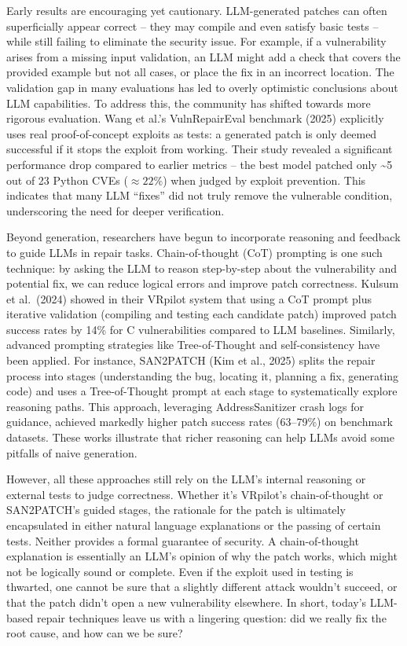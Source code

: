\documentclass[conference,compsoc]{IEEEtran}
\begin{document}
Early results are encouraging yet cautionary. LLM-generated patches can
often superficially appear correct -- they may compile and even satisfy
basic tests -- while still failing to eliminate the security issue. For
example, if a vulnerability arises from a missing input validation, an
LLM might add a check that covers the provided example but not all
cases, or place the fix in an incorrect location. The validation gap in
many evaluations has led to overly optimistic conclusions about LLM
capabilities. To address this, the community has shifted towards more
rigorous evaluation. Wang et al.'s VulnRepairEval benchmark (2025)
explicitly uses real proof-of-concept exploits as tests: a generated
patch is only deemed successful if it stops the exploit from working.
Their study revealed a significant performance drop compared to earlier
metrics -- the best model patched only \textasciitilde5 out of 23 Python
CVEs ($\approx 22\%$) when judged by exploit prevention. This indicates that many
LLM ``fixes'' did not truly remove the vulnerable condition,
underscoring the need for deeper verification.

Beyond generation, researchers have begun to incorporate reasoning and
feedback to guide LLMs in repair tasks. Chain-of-thought (CoT) prompting
is one such technique: by asking the LLM to reason step-by-step about
the vulnerability and potential fix, we can reduce logical errors and
improve patch correctness. Kulsum et al.~(2024) showed in their VRpilot
system that using a CoT prompt plus iterative validation (compiling and
testing each candidate patch) improved patch success rates by 14\% for C
vulnerabilities compared to LLM baselines. Similarly, advanced prompting
strategies like Tree-of-Thought and self-consistency have been applied.
For instance, SAN2PATCH (Kim et al., 2025) splits the repair process
into stages (understanding the bug, locating it, planning a fix,
generating code) and uses a Tree-of-Thought prompt at each stage to
systematically explore reasoning paths. This approach, leveraging
AddressSanitizer crash logs for guidance, achieved markedly higher patch
success rates (63--79\%) on benchmark datasets. These works illustrate
that richer reasoning can help LLMs avoid some pitfalls of naive
generation.

However, all these approaches still rely on the LLM's internal reasoning
or external tests to judge correctness. Whether it's VRpilot's
chain-of-thought or SAN2PATCH's guided stages, the rationale for the
patch is ultimately encapsulated in either natural language explanations
or the passing of certain tests. Neither provides a formal guarantee of
security. A chain-of-thought explanation is essentially an LLM's opinion
of why the patch works, which might not be logically sound or complete.
Even if the exploit used in testing is thwarted, one cannot be sure that
a slightly different attack wouldn't succeed, or that the patch didn't
open a new vulnerability elsewhere. In short, today's LLM-based repair
techniques leave us with a lingering question: did we really fix the
root cause, and how can we be sure?
\end{document}
